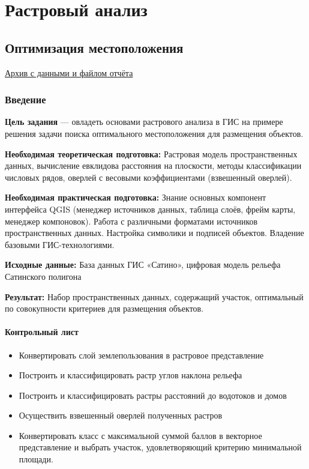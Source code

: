 \documentclass[
  12pt,
]{book}
\providecommand{\tightlist}{%
  \setlength{\itemsep}{0pt}\setlength{\parskip}{0pt}}
\begin{document}
\hypertarget{part-ux440ux430ux441ux442ux440ux43eux432ux44bux439-ux430ux43dux430ux43bux438ux437}{%
\part{Растровый анализ}\label{part-ux440ux430ux441ux442ux440ux43eux432ux44bux439-ux430ux43dux430ux43bux438ux437}}

\hypertarget{weighted-overlay}{%
\chapter{Оптимизация местоположения}\label{weighted-overlay}}

\href{https://1drv.ms/u/s!AmtmZDq3JgxHgZYOUyfdqKq93AamtA?e=JgHKi2}{Архив с данными и файлом отчёта}

\hypertarget{weighted-overlay-intro}{%
\section{Введение}\label{weighted-overlay-intro}}

\textbf{Цель задания} --- овладеть основами растрового анализа в ГИС на примере решения задачи поиска оптимального местоположения для размещения объектов.

\textbf{Необходимая теоретическая подготовка:} Растровая модель пространственных данных, вычисление евклидова расстояния на плоскости, методы классификации числовых рядов, оверлей с весовыми коэффициентами (взвешенный оверлей).

\textbf{Необходимая практическая подготовка:} Знание основных компонент интерфейса QGIS (менеджер источников данных, таблица слоёв, фрейм карты, менеджер компоновок). Работа с различными форматами источников пространственных данных. Настройка символики и подписей объектов. Владение базовыми ГИС-технологиями.

\textbf{Исходные данные:} База данных ГИС «Сатино», цифровая модель рельефа Сатинского полигона

\textbf{Результат:} Набор пространственных данных, содержащий участок, оптимальный по совокупности критериев для размещения объектов.

\hypertarget{weighted-overlay-control}{%
\subsection{Контрольный лист}\label{weighted-overlay-control}}

\begin{itemize}
\tightlist
\item
  Конвертировать слой землепользования в растровое представление
\item
  Построить и классифицировать растр углов наклона рельефа
\item
  Построить и классифицировать растры расстояний до водотоков и домов
\item
  Осуществить взвешенный оверлей полученных растров
\item
  Конвертировать класс с максимальной суммой баллов в векторное представление и выбрать участок, удовлетворяющий критерию минимальной площади.
\end{itemize}
\end{document}

